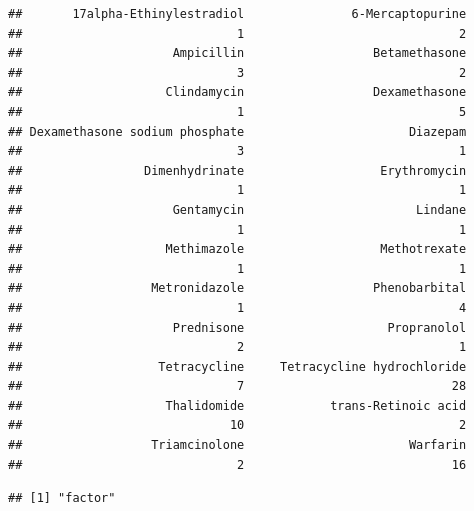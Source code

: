 \documentclass[12pt,]{article}
\newenvironment{Shaded}{\begin{snugshade}}{\end{snugshade}}
\newcommand{\KeywordTok}[1]{\textcolor[rgb]{0.13,0.29,0.53}{\textbf{#1}}}
\newcommand{\CommentTok}[1]{\textcolor[rgb]{0.56,0.35,0.01}{\textit{#1}}}
\newcommand{\OperatorTok}[1]{\textcolor[rgb]{0.81,0.36,0.00}{\textbf{#1}}}
\newcommand{\NormalTok}[1]{#1}
\begin{document}
\begin{verbatim}
##       17alpha-Ethinylestradiol               6-Mercaptopurine 
##                              1                              2 
##                     Ampicillin                  Betamethasone 
##                              3                              2 
##                    Clindamycin                  Dexamethasone 
##                              1                              5 
## Dexamethasone sodium phosphate                       Diazepam 
##                              3                              1 
##                 Dimenhydrinate                   Erythromycin 
##                              1                              1 
##                     Gentamycin                        Lindane 
##                              1                              1 
##                    Methimazole                   Methotrexate 
##                              1                              1 
##                  Metronidazole                  Phenobarbital 
##                              1                              4 
##                     Prednisone                    Propranolol 
##                              2                              1 
##                   Tetracycline     Tetracycline hydrochloride 
##                              7                             28 
##                    Thalidomide            trans-Retinoic acid 
##                             10                              2 
##                  Triamcinolone                       Warfarin 
##                              2                             16
\end{verbatim}

\begin{Shaded}
\end{Shaded}

\begin{verbatim}
## [1] "factor"
\end{verbatim}

\begin{Shaded}
\end{Shaded}
\end{document}
